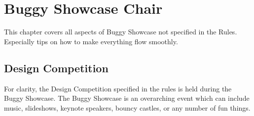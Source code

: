 \chapter{Buggy Showcase Chair}
This chapter covers all aspects of Buggy Showcase not specified in the Rules.
Especially tips on how to make everything flow smoothly.

\section{Design Competition}
For clarity, the Design Competition specified in the rules is held during the
Buggy Showcase. The Buggy Showcase is an overarching event which can include
music, slideshows, keynote speakers, bouncy castles, or any number of fun
things.
